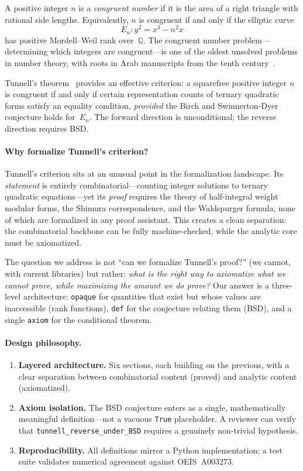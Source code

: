 \documentclass[11pt,a4paper]{article}
\theoremstyle{definition}
\newcommand{\Q}{\mathbb{Q}}
\newcommand{\lean}[1]{\texttt{#1}}
\newcommand{\En}{E_n}
\begin{document}
\medskip

A positive integer $n$ is a \emph{congruent number} if it is the area
of a right triangle with rational side lengths.  Equivalently, $n$ is
congruent if and only if the elliptic curve
\[
  \En : y^2 = x^3 - n^2 x
\]
has positive Mordell--Weil rank over~$\Q$.  The congruent number
problem---determining which integers are congruent---is one of the
oldest unsolved problems in number theory, with roots in Arab
manuscripts from the tenth century~\cite{Koblitz1993}.

Tunnell's theorem~\cite{Tunnell1983} provides an effective criterion:
a squarefree positive integer $n$ is congruent if and only if certain
representation counts of ternary quadratic forms satisfy an equality
condition, \emph{provided} the Birch and Swinnerton-Dyer conjecture
holds for~$\En$.  The forward direction is unconditional; the reverse
direction requires BSD.

\paragraph{Why formalize Tunnell's criterion?}
Tunnell's criterion sits at an unusual point in the formalization
landscape.  Its \emph{statement} is entirely combinatorial---counting
integer solutions to ternary quadratic equations---yet its
\emph{proof} requires the theory of half-integral weight modular
forms, the Shimura correspondence, and the Waldspurger formula, none
of which are formalized in any proof assistant.  This creates a clean
separation: the combinatorial backbone can be fully machine-checked,
while the analytic core must be axiomatized.

The question we address is not ``can we formalize Tunnell's proof?''
(we cannot, with current libraries) but rather: \emph{what is the
right way to axiomatize what we cannot prove, while maximizing the
amount we do prove?}  Our answer is a three-level architecture:
\lean{opaque} for quantities that exist but whose values are
inaccessible (rank functions), \lean{def} for the conjecture
relating them (BSD), and a single \lean{axiom} for the conditional
theorem.

\paragraph{Design philosophy.}
\begin{enumerate}[nosep]
  \item \textbf{Layered architecture.}  Six sections, each building
    on the previous, with a clear separation between combinatorial
    content (proved) and analytic content (axiomatized).
  \item \textbf{Axiom isolation.}  The BSD conjecture enters as a
    single, mathematically meaningful definition---not a vacuous
    \lean{True} placeholder.  A reviewer can verify that
    \lean{tunnell\_reverse\_under\_BSD} requires a genuinely
    non-trivial hypothesis.
  \item \textbf{Reproducibility.}  All definitions mirror a Python
    implementation; a test suite validates numerical agreement
    against OEIS~A003273.
\end{enumerate}
\end{document}
